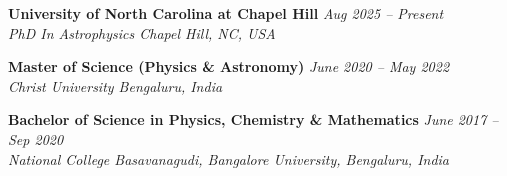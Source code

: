 \textbf{University of North Carolina at Chapel Hill} \hfill \textit{Aug 2025 -- Present} \\
\textit{PhD In Astrophysics \hfill Chapel Hill, NC, USA \\}

\vspace{0.5em}

\textbf{Master of Science (Physics \& Astronomy)} \hfill \textit{June 2020 -- May 2022} \\
\textit{Christ University \hfill Bengaluru, India} \\


\vspace{0.5em}

\textbf{Bachelor of Science in Physics, Chemistry \& Mathematics} \hfill \textit{June 2017 -- Sep 2020} \\
\textit{National College Basavanagudi, Bangalore University, \hfill Bengaluru, India} \\
